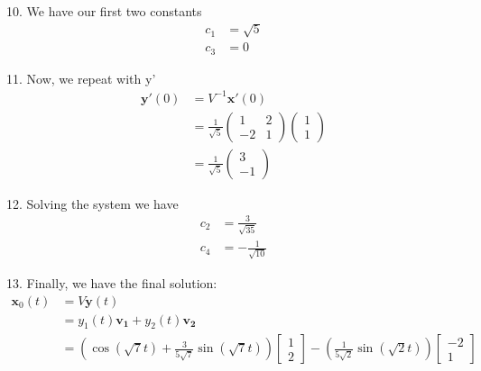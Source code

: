 \documentclass[12pt]{article}
\begin{document}
10. We have our first two constants
\begin{align*}
    c_1 & = \sqrt{5} \\
    c_3 & = 0
\end{align*}

11. Now, we repeat with y'
\begin{align*}
    \mathbf{y}'(0) & = V^{-1}\mathbf{x}'(0)                                                                                 \\
                   & = \frac{1}{\sqrt{5}}\begin{pmatrix} 1 & 2 \\ -2 & 1 \end{pmatrix} \begin{pmatrix} 1 \\ 1 \end{pmatrix} \\
                   & = \frac{1}{\sqrt{5}}\begin{pmatrix} 3 \\ -1  \end{pmatrix}
\end{align*}

12. Solving the system we have
\begin{align*}
    c_2 & = \frac{3}{\sqrt{35}}  \\
    c_4 & = -\frac{1}{\sqrt{10}}
\end{align*}

13. Finally, we have the final solution:
\begin{align*}
    \mathbf{x}_0(t) & = V\mathbf{y}(t)                                                                                                                                                             \\
                    & = y_1(t)\mathbf{v_1} + y_2(t)\mathbf{v_2}                                                                                                                                    \\
                    & = (\cos(\sqrt{7}t) + \frac{3}{5\sqrt{7}}{\sin(\sqrt{7}t)}) \begin{bmatrix} 1 \\ 2 \end{bmatrix} - (\frac{1}{5\sqrt{2}}\sin(\sqrt{2}t)) \begin{bmatrix} -2 \\ 1 \end{bmatrix}
\end{align*}
\end{document}
